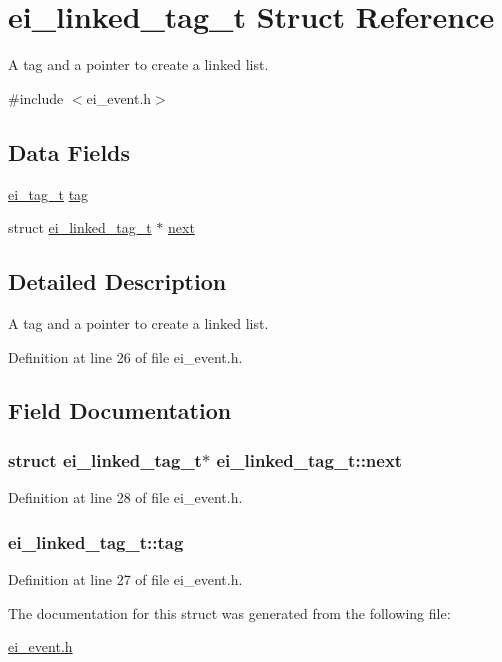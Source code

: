 \hypertarget{structei__linked__tag__t}{
\section{ei\_\-linked\_\-tag\_\-t Struct Reference}
\label{structei__linked__tag__t}
}


A tag and a pointer to create a linked list.  


{\ttfamily \#include $<$ei\_\-event.h$>$}\subsection*{Data Fields}
\begin{DoxyCompactItemize}
\item 
\hyperlink{ei__event_8h_a24a8242260cfd8ddb6ef915f3de5a10f}{ei\_\-tag\_\-t} \hyperlink{structei__linked__tag__t_aa1c771b8b7ac760ee10d33d5a29c97d7}{tag}
\item 
struct \hyperlink{structei__linked__tag__t}{ei\_\-linked\_\-tag\_\-t} $\ast$ \hyperlink{structei__linked__tag__t_a86bfd7536ee8b26a3f2b1a46562591e4}{next}
\end{DoxyCompactItemize}


\subsection{Detailed Description}
A tag and a pointer to create a linked list. 

Definition at line 26 of file ei\_\-event.h.

\subsection{Field Documentation}
\hypertarget{structei__linked__tag__t_a86bfd7536ee8b26a3f2b1a46562591e4}{
\subsubsection[{next}]{\setlength{\rightskip}{0pt plus 5cm}struct {\bf ei\_\-linked\_\-tag\_\-t}$\ast$ {\bf ei\_\-linked\_\-tag\_\-t::next}}}
\label{structei__linked__tag__t_a86bfd7536ee8b26a3f2b1a46562591e4}


Definition at line 28 of file ei\_\-event.h.\hypertarget{structei__linked__tag__t_aa1c771b8b7ac760ee10d33d5a29c97d7}{
\subsubsection[{tag}]{ {\bf ei\_\-linked\_\-tag\_\-t::tag}}}
\label{structei__linked__tag__t_aa1c771b8b7ac760ee10d33d5a29c97d7}


Definition at line 27 of file ei\_\-event.h.

The documentation for this struct was generated from the following file:\begin{DoxyCompactItemize}
\item 
\hyperlink{ei__event_8h}{ei\_\-event.h}\end{DoxyCompactItemize}
